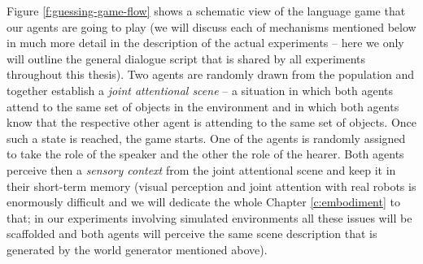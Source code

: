 Figure \ref{f:guessing-game-flow} shows a schematic view of the
language game that our agents are going to play (we will discuss each
of mechanisms mentioned below in much more detail in the description
of the actual experiments -- here we only will outline the general
dialogue script that is shared by all experiments throughout this
thesis). Two agents are randomly drawn from the population and
together establish a \emph{joint attentional scene}
\citep{tomasello95jointattention} -- a situation in which both agents
attend to the same set of objects in the environment and in which both
agents know that the respective other agent is attending to the same
set of objects. Once such a state is reached, the game starts. One of
the agents is randomly assigned to take the role of the speaker and
the other the role of the hearer. Both agents perceive then a
\emph{sensory context} from the joint attentional scene and keep it in
their short-term memory (visual perception and joint attention with
real robots is enormously difficult and we will dedicate the whole
Chapter \ref{c:embodiment} to that; in our experiments involving
simulated environments all these issues will be scaffolded and both
agents will perceive the same scene description that is generated by
the world generator mentioned above).


